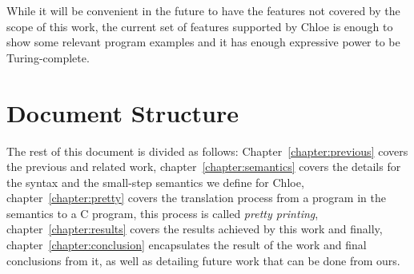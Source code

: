 While it will be convenient in the future to have the features not covered by the scope of this work, the current set of features supported by Chloe is enough to show some relevant program examples and it has enough expressive power to be Turing-complete.


\section{Document Structure}\label{section:document_structure}

The rest of this document is divided as follows: Chapter~\ref{chapter:previous} covers the previous and related work, chapter~\ref{chapter:semantics} covers the details for the syntax and the small-step semantics we define for Chloe, chapter~\ref{chapter:pretty} covers the translation process from a program in the semantics to a C program, this process is called \textit{pretty printing}, chapter~\ref{chapter:results} covers the results achieved by this work and finally, chapter~\ref{chapter:conclusion} encapsulates the result of the work and final conclusions from it, as well as detailing future work that can be done from ours.